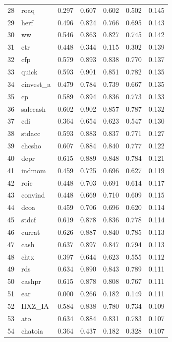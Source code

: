 \documentclass[12pt]{article}
\begin{document}
\begin{footnotesize}
\begin{longtable}{rl|c|c|c|c|c}
		28 & roaq & 0.297 & 0.607 & 0.602 & 0.502 & 0.145 \\ 
		29 & herf & 0.496 & 0.824 & 0.766 & 0.695 & 0.143 \\ 
		30 & ww & 0.546 & 0.863 & 0.827 & 0.745 & 0.142 \\ 
		31 & etr & 0.448 & 0.344 & 0.115 & 0.302 & 0.139 \\ 
		32 & cfp & 0.579 & 0.893 & 0.838 & 0.770 & 0.137 \\ 
		33 & quick & 0.593 & 0.901 & 0.851 & 0.782 & 0.135 \\ 
		34 & cinvest\_a & 0.479 & 0.784 & 0.739 & 0.667 & 0.135 \\ 
		35 & cp & 0.589 & 0.894 & 0.836 & 0.773 & 0.133 \\ 
		36 & salecash & 0.602 & 0.902 & 0.857 & 0.787 & 0.132 \\ 
		37 & cdi & 0.364 & 0.654 & 0.623 & 0.547 & 0.130 \\ 
		38 & stdacc & 0.593 & 0.883 & 0.837 & 0.771 & 0.127 \\ 
		39 & chcsho & 0.607 & 0.884 & 0.840 & 0.777 & 0.122 \\ 
		40 & depr & 0.615 & 0.889 & 0.848 & 0.784 & 0.121 \\ 
		41 & indmom & 0.459 & 0.725 & 0.696 & 0.627 & 0.119 \\ 
		42 & roic & 0.448 & 0.703 & 0.691 & 0.614 & 0.117 \\ 
		43 & convind & 0.448 & 0.669 & 0.710 & 0.609 & 0.115 \\ 
		44 & dcoa & 0.459 & 0.706 & 0.696 & 0.620 & 0.114 \\ 
		45 & stdcf & 0.619 & 0.878 & 0.836 & 0.778 & 0.114 \\ 
		46 & currat & 0.626 & 0.887 & 0.840 & 0.785 & 0.113 \\ 
		47 & cash & 0.637 & 0.897 & 0.847 & 0.794 & 0.113 \\ 
		48 & chtx & 0.397 & 0.644 & 0.623 & 0.555 & 0.112 \\ 
		49 & rds & 0.634 & 0.890 & 0.843 & 0.789 & 0.111 \\ 
		50 & cashpr & 0.615 & 0.878 & 0.808 & 0.767 & 0.111 \\ 
		51 & ear & 0.000 & 0.266 & 0.182 & 0.149 & 0.111 \\ 
		52 & HXZ\_IA & 0.584 & 0.838 & 0.780 & 0.734 & 0.109 \\ 
		53 & ato & 0.634 & 0.884 & 0.831 & 0.783 & 0.107 \\ 
		54 & chatoia & 0.364 & 0.437 & 0.182 & 0.328 & 0.107 \\ 

\end{longtable}
\end{footnotesize}
\end{document}
